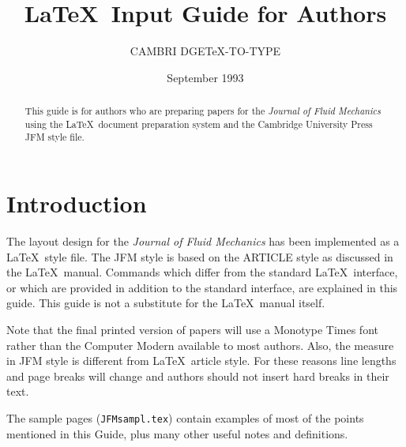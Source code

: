 
\title[Journal of Fluid Mechanics]{\LaTeX\ Input Guide for Authors}

\author[\LaTeX\ Input Guide for Authors]{C\ls A\ls M\ls B\ls R\ls I\ls %
D\ls G\ls E\ns \TeX\ls -\ls T\ls O\ls -\ls T\ls Y\ls P\ls E}

\date{September 1993}
\pagerange{\pageref{firstpage}--\pageref{lastpage}}




\ifnfssone
\else
  \ifnfsstwo
  \else
    \ifoldfss
      \let\mathcal\cal
      \let\mathrm\rm
      \let\mathsf\sf
    \fi
  \fi
\fi

\label{firstpage}
\maketitle

\begin{abstract}
This guide is for authors who are preparing papers for the
{\em Journal of Fluid Mechanics}
using the \LaTeX\ document preparation system and the Cambridge
University Press JFM style file.
\end{abstract}

\tableofcontents

\section{Introduction}

The layout design for the {\em Journal of Fluid Mechanics} has been implemented as a \LaTeX\ style file.
The JFM style is based on the ARTICLE style as discussed in the \LaTeX\
manual.
Commands which differ from the standard \LaTeX\ interface, or which are
provided in addition to the standard interface, are explained in this
guide. This guide is not a substitute for the \LaTeX\ manual itself.

Note that the final printed version of papers will use a Monotype Times
font rather than the Computer Modern available to most authors. Also,
the measure in JFM style is different from \LaTeX\ article style. For
these reasons line lengths and page breaks will change and authors
should not insert hard breaks in their text. 

The sample pages (\verb"JFMsampl.tex") contain examples of most of the points
mentioned in this Guide, plus many other useful notes and definitions.

